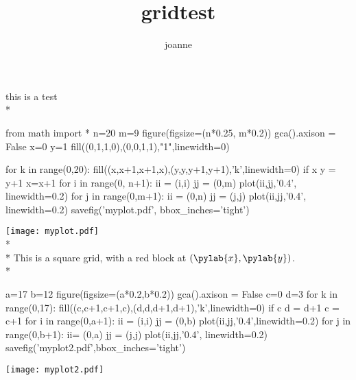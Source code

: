 \documentclass[11pt]{article}
\title{gridtest}
\author{joanne}
\begin{document}
\maketitle
this is a test\\*
\begin{pylabcode}
from math import *
n=20
m=9
figure(figsize=(n*0.25, m*0.2))
gca().axison = False
x=0
y=1
fill((0,1,1,0),(0,0,1,1),"1",linewidth=0)

for k in range(0,20):
	fill((x,x+1,x+1,x),(y,y,y+1,y+1),'k',linewidth=0)
	if x%
		y = y+1
	x=x+1
for i in range(0, n+1): 
	ii = (i,i)
	jj = (0,m)
	plot(ii,jj,'0.4', linewidth=0.2)
for j in range(0,m+1):
	ii = (0,n)
	jj = (j,j)
	plot(ii,jj,'0.4', linewidth=0.2)
savefig('myplot.pdf', bbox_inches='tight')
\end{pylabcode}
\texttt{[image: myplot.pdf]}\\*\\*
This is a 
square grid, with a red block at $(\pylab{x}, \pylab{y})$.\\*
\begin{pylabcode}
a=17
b=12
figure(figsize=(a*0.2,b*0.2))
gca().axison = False
c=0
d=3
for k in range(0,17):
	fill((c,c+1,c+1,c),(d,d,d+1,d+1),'k',linewidth=0)
	if c%
		d = d+1
	c = c+1
for i in range(0,a+1):
	ii = (i,i)
	jj = (0,b)
	plot(ii,jj,'0.4',linewidth=0.2)
for j in range(0,b+1):
	ii= (0,a)
	jj = (j,j)
	plot(ii,jj,'0.4', linewidth=0.2)
savefig('myplot2.pdf',bbox_inches='tight')
\end{pylabcode}
\texttt{[image: myplot2.pdf]}
\end{document}
